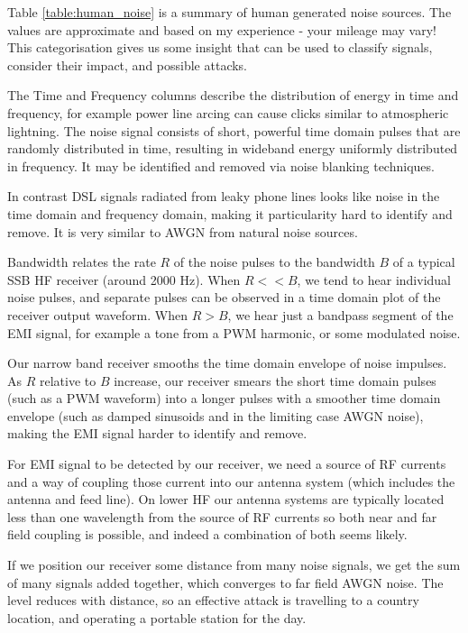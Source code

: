 \documentclass{article}
\begin{document}
Table \ref{table:human_noise} is a summary of human generated noise sources.  The values are approximate and based on my experience - your mileage may vary!  This categorisation gives us some insight that can be used to classify signals, consider their impact, and possible attacks.

The Time and Frequency columns describe the distribution of energy in time and frequency, for example power line arcing can cause clicks similar to atmospheric lightning.  The noise signal consists of short, powerful time domain pulses that are randomly distributed in time, resulting in wideband energy uniformly distributed in frequency. It may be identified and removed via noise blanking techniques.

In contrast DSL signals radiated from leaky phone lines looks like noise in the time domain and frequency domain, making it particularity hard to identify and remove.  It is very similar to AWGN from natural noise sources.

Bandwidth relates the rate $R$ of the noise pulses to the bandwidth $B$ of a typical SSB HF receiver (around 2000 Hz).  When $R<<B$, we tend to hear individual noise pulses, and separate pulses can be observed in a time domain plot of the receiver output waveform.  When $R>B$, we hear just a bandpass segment of the EMI signal, for example a tone from a PWM harmonic, or some modulated noise.

Our narrow band receiver smooths the time domain envelope of noise impulses. As $R$ relative to $B$ increase, our receiver smears the short time domain pulses (such as a PWM waveform) into a longer pulses with a smoother time domain envelope (such as damped sinusoids and in the limiting case AWGN noise), making the EMI signal harder to identify and remove.

For EMI signal to be detected by our receiver, we need a source of RF currents and a way of coupling those current into our antenna system (which includes the antenna and feed line).  On lower HF our antenna systems are typically located less than one wavelength from the source of RF currents so both near and far field coupling is possible, and indeed a combination of both seems likely.

If we position our receiver some distance from many noise signals, we get the sum of many signals added together, which converges to far field AWGN noise.  The level reduces with distance, so an effective attack is travelling to a country location, and operating a portable station for the day.
\end{document}
